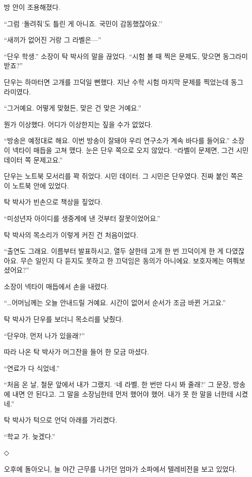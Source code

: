 \documentclass[
  korean,
  letterpaper,
  twoside,
  open=any,
  fontsize=12.5pt,
  headings=small]{scrbook}
\begin{document}
방 안이 조용해졌다.

``그럼 `돌려줘'도 틀린 게
아니죠. 국민이 감동했잖아요.''

``새끼가 없어진 거랑 그
라벨은---''

``단우 학생.'' 소장이 탁
박사의 말을 끊었다. ``시험 볼
때 찍은 문제도, 맞으면
동그라미 받죠?''

단우는 하마터면 고개를 끄덕일
뻔했다. 지난 수학 시험 마지막
문제를 찍었는데 동그라미였다.

``그거예요. 어떻게 맞혔든,
맞은 건 맞은 거예요.''

뭔가 이상했다. 어디가
이상한지는 짚을 수가 없었다.

``방송은 예정대로 해요. 이번
방송이 잘돼야 우리 연구소가
계속 바다를 들어요.'' 소장이
넥타이 매듭을 고쳐 맸다. 눈은
단우 쪽으로 오지 않았다.
``라벨이 문제면, 그건 시민
데이터 쪽 문제고요.''

단우는 노트북 모서리를 꽉
쥐었다. 시민 데이터. 그 시민은
단우였다. 진짜 붙인 쪽은 이
노트북 안에 있었다.

탁 박사가 빈손으로 책상을
짚었다.

``미성년자 아이디를 생중계에
낸 것부터 잘못이었어요.''

탁 박사의 목소리가 이렇게 커진
건 처음이었다.

``출연도 그래요. 이름부터
발표하시고, 열두 살한테 고개
한 번 끄덕이게 한 게
다였잖아요. 무슨 일인지 다
듣지도 못하고 한 끄덕임은
동의가 아니에요. 보호자께는
여쭤보셨어요?''

소장이 넥타이 매듭에서 손을
내렸다.

``\ldots 어머님께는 오늘
안내드릴 거예요. 시간이 없어서
순서가 조금 바뀐 거고요.''

탁 박사가 단우를 보더니
목소리를 낮췄다.

``단우야, 먼저 나가 있을래?''

따라 나온 탁 박사가 머그잔을
들어 한 모금 마셨다.

``연료가 다 식었네.''

``처음 온 날, 철문 앞에서 내가
그랬지. `네 라벨, 한 번만 다시
봐 줄래?' 그 문장, 방송에 내면
안 된다고. 그 말을 소장님한테
먼저 했어야 했어. 내가 못 한
말을 너한테 시켰네.''

탁 박사가 턱으로 언덕 아래를
가리켰다.

``학교 가. 늦겠다.''

\begin{center}◇\end{center}\nopagebreak

오후에 돌아오니, 늘 야간
근무를 나가던 엄마가 소파에서
텔레비전을 보고 있었다.
\end{document}
